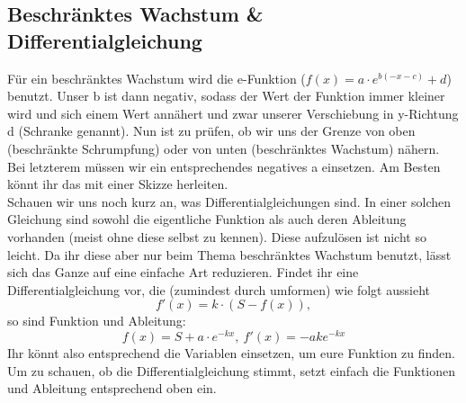 \subsection{Beschränktes Wachstum \& Differentialgleichung}
Für ein beschränktes Wachstum wird die e-Funktion (\(f(x)=a\cdot e^{b(-x-c)}+d\)) benutzt. Unser b ist dann negativ, sodass der Wert der Funktion immer kleiner wird und sich einem Wert annähert und zwar unserer Verschiebung in y-Richtung d (Schranke genannt). Nun ist zu prüfen, ob wir uns der Grenze von oben (beschränkte Schrumpfung) oder von unten (beschränktes Wachstum) nähern. Bei letzterem müssen wir ein entsprechendes negatives a einsetzen. Am Besten könnt ihr das mit einer Skizze herleiten.\\
Schauen wir uns noch kurz an, was Differentialgleichungen sind. In einer solchen Gleichung sind sowohl die eigentliche Funktion als auch deren Ableitung vorhanden (meist ohne diese selbst zu kennen). Diese aufzulösen ist nicht so leicht. Da ihr diese aber nur beim Thema beschränktes Wachstum benutzt, lässt sich das Ganze auf eine einfache Art reduzieren. Findet ihr eine Differentialgleichung vor, die (zumindest durch umformen) wie folgt aussieht
\[f'(x)=k\cdot (S-f(x)),\]
so sind Funktion und Ableitung:
\[f(x)=S+a\cdot e^{-kx},\ f'(x)=-ake^{-kx}\]
Ihr könnt also entsprechend die Variablen einsetzen, um eure Funktion zu finden. Um zu schauen, ob die Differentialgleichung stimmt, setzt einfach die Funktionen und Ableitung entsprechend oben ein.
